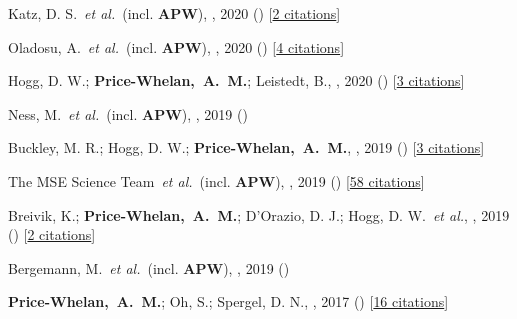 \item[{\color{deemph}\scriptsize9}]Katz, D. S.~\textit{et al.}~(incl. \textbf{APW}), , 2020 () [\href{http://adsabs.harvard.edu/abs/2020arXiv201005102K}{2 citations}]

\item[{\color{deemph}\scriptsize8}]Oladosu, A.~\textit{et al.}~(incl. \textbf{APW}), , 2020 () [\href{http://adsabs.harvard.edu/abs/2020arXiv200704459O}{4 citations}]

\item[{\color{deemph}\scriptsize7}]Hogg, D. W.; \textbf{Price-Whelan,~A.~M.}; Leistedt, B., , 2020 () [\href{http://adsabs.harvard.edu/abs/2020arXiv200514199H}{3 citations}]

\item[{\color{deemph}\scriptsize6}]Ness, M.~\textit{et al.}~(incl. \textbf{APW}), , 2019 ()

\item[{\color{deemph}\scriptsize5}]Buckley, M. R.; Hogg, D. W.; \textbf{Price-Whelan,~A.~M.}, , 2019 () [\href{http://adsabs.harvard.edu/abs/2019arXiv190700987B}{3 citations}]

\item[{\color{deemph}\scriptsize4}]The MSE Science Team~\textit{et al.}~(incl. \textbf{APW}), , 2019 () [\href{http://adsabs.harvard.edu/abs/2019arXiv190404907T}{58 citations}]

\item[{\color{deemph}\scriptsize3}]Breivik, K.; \textbf{Price-Whelan,~A.~M.}; D'Orazio, D. J.; Hogg, D. W.~\textit{et al.}, , 2019 () [\href{http://adsabs.harvard.edu/abs/2019arXiv190305094B}{2 citations}]

\item[{\color{deemph}\scriptsize2}]Bergemann, M.~\textit{et al.}~(incl. \textbf{APW}), , 2019 ()

\item[{\color{deemph}\scriptsize1}]\textbf{Price-Whelan,~A.~M.}; Oh, S.; Spergel, D. N., , 2017 () [\href{http://adsabs.harvard.edu/abs/2017arXiv170903532P}{16 citations}]